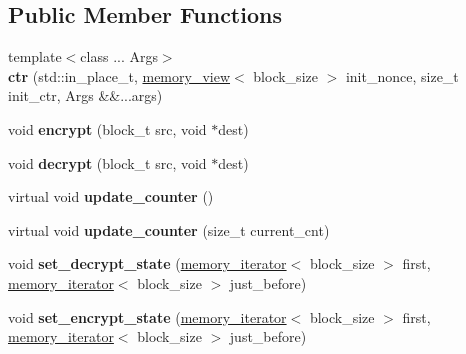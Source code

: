 \subsection*{Public Member Functions}
\begin{DoxyCompactItemize}
\item 
\mbox{\label{structouchi_1_1crypto_1_1ctr_a7bfce490542249075f0653a900eb69ab}} 
{\footnotesize template$<$class ... Args$>$ }\\{\bfseries ctr} (std\+::in\+\_\+place\+\_\+t, \mbox{\hyperlink{classouchi_1_1crypto_1_1memory__view}{memory\+\_\+view}}$<$ block\+\_\+size $>$ init\+\_\+nonce, size\+\_\+t init\+\_\+ctr, Args \&\&...args)
\item 
\mbox{\label{structouchi_1_1crypto_1_1ctr_ac013d457d1ee3fb1f0d61283536d564d}} 
void {\bfseries encrypt} (block\+\_\+t src, void $\ast$dest)
\item 
\mbox{\label{structouchi_1_1crypto_1_1ctr_a1d8d79a53415ae05d34c0bee7e4e55ff}} 
void {\bfseries decrypt} (block\+\_\+t src, void $\ast$dest)
\item 
\mbox{\label{structouchi_1_1crypto_1_1ctr_a771781a24e85bc84137eb87729da194d}} 
virtual void {\bfseries update\+\_\+counter} ()
\item 
\mbox{\label{structouchi_1_1crypto_1_1ctr_a9200b3a94e20fdedc047c9b5986a2c91}} 
virtual void {\bfseries update\+\_\+counter} (size\+\_\+t current\+\_\+cnt)
\item 
\mbox{\label{structouchi_1_1crypto_1_1ctr_afc24b77fa9132c100cc318a14bca9863}} 
void {\bfseries set\+\_\+decrypt\+\_\+state} (\mbox{\hyperlink{structouchi_1_1crypto_1_1memory__iterator}{memory\+\_\+iterator}}$<$ block\+\_\+size $>$ first, \mbox{\hyperlink{structouchi_1_1crypto_1_1memory__iterator}{memory\+\_\+iterator}}$<$ block\+\_\+size $>$ just\+\_\+before)
\item 
\mbox{\label{structouchi_1_1crypto_1_1ctr_a938817f0b0bdeff5c2be080723e21ead}} 
void {\bfseries set\+\_\+encrypt\+\_\+state} (\mbox{\hyperlink{structouchi_1_1crypto_1_1memory__iterator}{memory\+\_\+iterator}}$<$ block\+\_\+size $>$ first, \mbox{\hyperlink{structouchi_1_1crypto_1_1memory__iterator}{memory\+\_\+iterator}}$<$ block\+\_\+size $>$ just\+\_\+before)
\end{DoxyCompactItemize}
